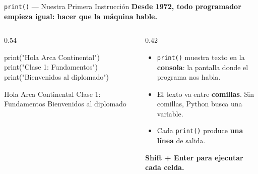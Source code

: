 \documentclass[aspectratio=169, 11pt]{beamer}
\begin{document}
\begin{frame}[fragile]{\texttt{print()} --- Nuestra Primera Instrucción}
  \vspace{-6pt}
  {\small\color{arcaDark}\bfseries
    Desde 1972, todo programador empieza igual: hacer que la máquina hable.}

  \vspace{4pt}
  \begin{columns}[T]
    \begin{column}{0.54\textwidth}
      \begin{pyblock}[title={\scriptsize\faPlay\hspace{4pt}Escribamos esto en Colab}]
print("Hola Arca Continental")
print("Clase 1: Fundamentos")
print("Bienvenidos al diplomado")
      \end{pyblock}
      \vspace{-2pt}
      \begin{outputblock}
Hola Arca Continental
Clase 1: Fundamentos
Bienvenidos al diplomado
      \end{outputblock}
    \end{column}

    \begin{column}{0.42\textwidth}
      {\footnotesize\color{textMuted}
      \begin{itemize}\setlength{\itemsep}{4pt}
        \item[{\color{arcaRed}\scriptsize\faComment}]
          \texttt{print()} muestra texto en la
          \textbf{consola}: la pantalla donde
          el programa nos habla.

        \item[{\color{arcaRed}\scriptsize\faQuoteRight}]
          El texto va entre \textbf{comillas}.
          Sin comillas, Python busca una variable.

        \item[{\color{arcaRed}\scriptsize\faRedo}]
          Cada \texttt{print()} produce
          \textbf{una línea} de salida.
      \end{itemize}
      }

      \vspace{4pt}
      {\scriptsize\color{arcaRed}\bfseries
        Shift + Enter para ejecutar cada celda.}
    \end{column}
  \end{columns}
\end{frame}
\end{document}
